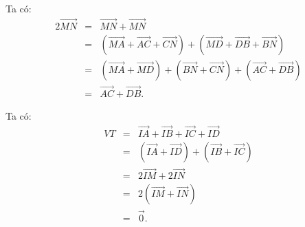 \begin{bt}
{\begin{listEX}
			\item Ta có:
			{\allowdisplaybreaks
				\begin{eqnarray*}
					2\overrightarrow{MN}&=&\overrightarrow{MN} + \overrightarrow{MN}\\
					&=&(\overrightarrow{MA} + \overrightarrow{AC} + \overrightarrow{CN}) + (\overrightarrow{MD} + \overrightarrow{DB} + \overrightarrow{BN}) \\
					&=& \left(\overrightarrow{MA} + \overrightarrow{MD}\right) + \left(\overrightarrow{BN} + \overrightarrow{CN} \right) + (\overrightarrow{AC} + \overrightarrow{DB})\\
					&=& \overrightarrow{AC} + \overrightarrow{DB}.
			\end{eqnarray*}}
			\item Ta có:
			{\allowdisplaybreaks
				\begin{eqnarray*}
					VT&=&\overrightarrow{IA} + \overrightarrow{IB} + \overrightarrow{IC} + \overrightarrow{ID} \\
					&=& \left(\overrightarrow{IA} + \overrightarrow{ID}\right) + \left(\overrightarrow{IB} + \overrightarrow{IC} \right) \\
					&=& 2\overrightarrow{IM} + 2\overrightarrow{IN}\\
					&=& 2(\overrightarrow{IM} + \overrightarrow{IN})\\
					&=& \overrightarrow{0}.
			\end{eqnarray*}}
		\end{listEX}
	}
\end{bt}

